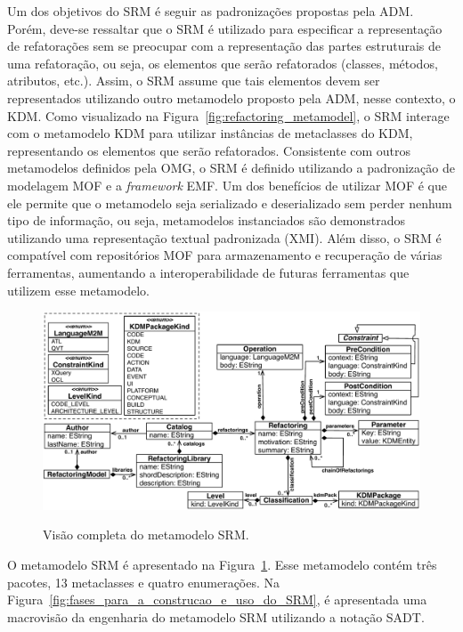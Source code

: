 Um dos objetivos do SRM é seguir as padronizações propostas pela ADM. Porém, deve-se ressaltar que o SRM é utilizado para especificar a representação de refatorações sem se preocupar com a representação das partes estruturais de uma refatoração, ou seja, os elementos que serão refatorados (classes, métodos, atributos, etc.). Assim, o SRM assume que tais elementos devem ser representados utilizando outro metamodelo proposto pela ADM, nesse contexto, o KDM. Como visualizado na Figura~\ref{fig:refactoring_metamodel}, o SRM interage com o metamodelo KDM para utilizar instâncias de metaclasses do KDM, representando os elementos que serão refatorados. Consistente com outros metamodelos definidos pela OMG, o SRM é definido utilizando a padronização de modelagem MOF e a \textit{framework} EMF. Um dos benefícios de utilizar MOF é que ele permite que o metamodelo seja serializado e deserializado sem perder nenhum tipo de informação, ou seja, metamodelos instanciados são demonstrados utilizando uma representação textual padronizada (XMI). Além disso, o SRM é compatível com repositórios MOF para armazenamento e recuperação de várias ferramentas, aumentando a interoperabilidade de futuras ferramentas que utilizem esse metamodelo.

\begin{figure}[h]
	\centering
		\caption{Visão completa do metamodelo SRM.}
	\includegraphics[scale=0.65]{images/newMetamodelSRM}
	\label{fig:meta_modelo_SRM}
	\fautor
\end{figure}

O metamodelo SRM é apresentado na Figura~\ref{fig:meta_modelo_SRM}. Esse metamodelo contém três pacotes, 13 metaclasses e quatro enumerações. Na Figura~\ref{fig:fases_para_a_construcao_e_uso_do_SRM}, é apresentada uma macrovisão da engenharia do metamodelo SRM utilizando a notação SADT.%

